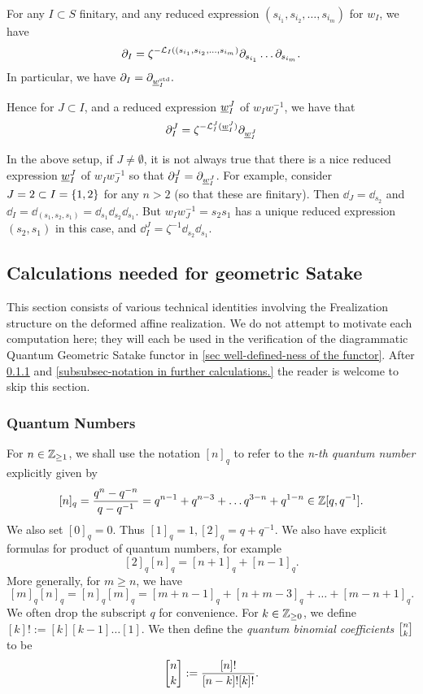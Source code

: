 \begin{corollary}\label{corollary-normalization}
    For any $I\subset S$ finitary, and any reduced expression $(s_{i_1},s_{i_2},\ldots, s_{i_m})$ for $w_I$, we have
    $$\partial_I=\zeta^{-\mathcal{L}_I((s_{i_1},s_{i_2},\ldots, s_{i_m})}\partial_{s_{i_1}}\ldots \partial_{s_{i_m}}. $$
    In particular, we have $\partial_I=\partial_{\underline{w}_I^{\operatorname{std}}}.$

    Hence for $J\subset I$, and a reduced expression $\underline{w}_I^J$ of $w_Iw_J^{-1}$, we have that
    $$\partial_I^J=\zeta^{-\mathcal{L}_I^J(\underline{w}_I^J)}\partial_{\underline{w}_I^J}$$
\end{corollary}
\begin{remark} \label{rmk:wontworkforIJ}
    In the above setup, if $J\neq \emptyset$, it is not always true that there is a nice reduced expression $\underline{w}_I^J$ of $w_Iw_J^{-1}$ so that $\partial_I^J=\partial_{\underline{w}_I^J}$.
    For example, consider $J={2} \subset I=\{1,2\}$ for any $n>2$ (so that these are finitary). 
    Then $\dd_J=\dd_{s_2}$ and $\dd_I=\dd_{(s_1,s_2,s_1)}=\dd_{s_1}\dd_{s_2}\dd_{s_1}$. 
    But  $w_Iw_J^{-1}=s_2s_1$ has a unique reduced expression $(s_2,s_1)$ in this case, and $\dd_I^J=\zeta^{-1}\dd_{s_2}\dd_{s_1}$.
\end{remark}



\subsection{Calculations needed for geometric Satake}
\label{subsec-further frob calculations}

This section consists of various technical identities involving the Frealization structure on the deformed affine realization. We do not attempt to motivate each computation here; they will each be used in the verification of the diagrammatic Quantum Geometric Satake functor in \cref{sec well-defined-ness of the functor}. After \cref{subsubsec quantum numbers} and \cref{subsubsec-notation in further calculations.} the reader is welcome to skip this section.


\subsubsection{Quantum Numbers}\label{subsubsec quantum numbers}
For $n \in \mathbb{Z}_{\geq 1}$, we shall use the notation $[n]_q$ to refer to the \emph{n-th quantum number} explicitly given by 
$$[n]_q=\frac{q^n-q^{-n}}{q-q^{-1}}=q^{n-1}+q^{n-3}+\ldots q^{3-n}+q^{1-n} \in \mathbb{Z}[q,q^{-1}].$$
We also set $[0]_q=0$.
Thus $[1]_q=1, [2]_q=q+q^{-1}$. 
We also have explicit formulas for product of quantum numbers, for example 
$$[2]_q[n]_q=[n+1]_q+[n-1]_q.$$
More generally, for $m \geq n$, we have 
$$[m]_q[n]_q=[n]_q[m]_q=[m+n-1]_q+[n+m-3]_q+\ldots +[m-n+1]_q.$$
We often drop the subscript $q$ for convenience.
For $k \in \mathbb{Z}_{\geq 0}$, we define
$[k]!:= [k][k-1]\ldots [1]$.
We then define the \emph{quantum binomial coefficients} $\qbinom{n}{k}$ to be
$$\qbinom{n}{k}:= \frac{[n]!}{[n-k]! [k]!}.$$

